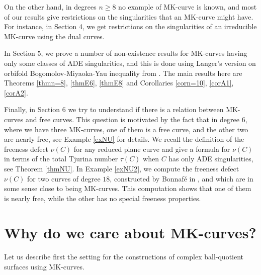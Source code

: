 \documentclass[11pt]{amsart}
\theoremstyle{plain}
\theoremstyle{definition}
\numberwithin{equation}{section}
\begin{document}
On the other hand, in degrees $n \geq 8$ no example of MK-curve is known, and most of our results give restrictions on the singularities that an MK-curve might have.
For instance, in Section 4, we get restrictions on the singularities of an irreducible MK-curve using the dual curves.

In Section $5$, we prove a number of non-existence results for MK-curves having only some classes of ADE singularities, and this is done using Langer's version on orbifold Bogomolov-Miyaoka-Yau inequality from \cite{Langer}. The main results here are
Theorems \ref{thmn=8}, \ref{thmE6}, \ref{thmE8} and Corollaries
\ref{corn=10}, \ref{corA1}, \ref{corA2}.

Finally, in Section $6$ we try to understand if there is a relation between MK-curves and free curves. This question is motivated by the fact that
in degree $6$, where we have three MK-curves, one of them is a free curve, and the other two are nearly free, see Example \ref{exNU} for details.
We recall the definition of the freeness defect $\nu(C)$ for any reduced plane curve and give a formula for $\nu(C)$ in terms of the total Tjurina number $\tau(C)$ when $C$ has only ADE singularities, see Theorem \ref{thmNU}. In Example \ref{exNU2}, we compute the freeness defect $\nu(C)$ for two curves of degree $18$, constructed by Bonnaf\'e in
\cite{Bonnafe}, and which are in some sense close to being MK-curves.
This computation shows that one of them is nearly free, while the other has no special freeness properties.

\section{Why do we care about MK-curves?}

Let us describe first the setting for the constructions of complex ball-quotient surfaces using MK-curves.
\end{document}
